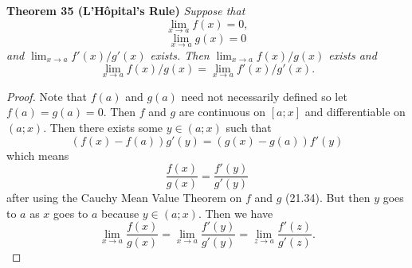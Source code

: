 \documentclass{article}
\begin{document}
\begin{flushleft}
\textbf{Theorem 35 (L'H\^{o}pital's Rule)}
\textsl{Suppose that
\[
\lim_{x \rightarrow a} f(x) = 0,
\]
\[
\lim_{x \rightarrow a} g(x) = 0
\]
and $\lim_{x \rightarrow a} f'(x)/g'(x)$ exists. Then $\lim_{x \rightarrow a} f(x)/g(x)$ exists and
\[
\lim_{x \rightarrow a} f(x)/g(x) = \lim_{x \rightarrow a} f'(x)/g'(x).
\]}
\begin{proof}
Note that $f(a)$ and $g(a)$ need not necessarily defined so let $f(a) = g(a) = 0$. Then $f$ and $g$ are continuous on $[a;x]$ and differentiable on $(a;x)$. Then there exists some $y \in (a;x)$ such that
\[
(f(x) - f(a)) g'(y) = (g(x) - g(a)) f'(y)
\]
which means
\[
\frac{f(x)}{g(x)} = \frac{f'(y)}{g'(y)}
\]
after using the Cauchy Mean Value Theorem on $f$ and $g$ (21.34). But then $y$ goes to $a$ as $x$ goes to $a$ because $y \in (a;x)$. Then we have
\[
\lim_{x \rightarrow a} \frac{f(x)}{g(x)} = \lim_{x \rightarrow a} \frac{f'(y)}{g'(y)} = \lim_{z \rightarrow a} \frac{f'(z)}{g'(z)}.
\]
\end{proof}

\end{flushleft}
\end{document}
